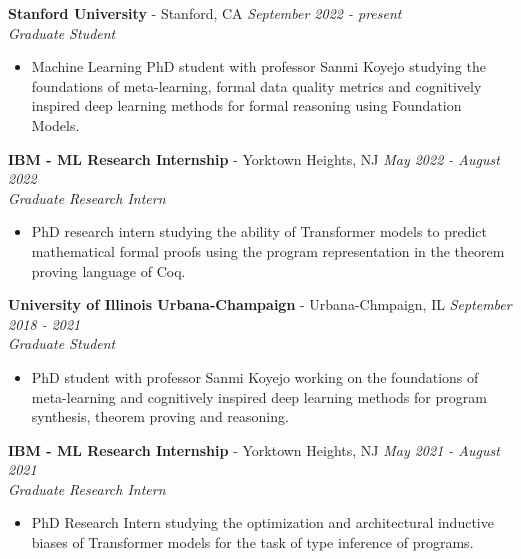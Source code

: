 \documentclass{article}
\newenvironment{changemargin}[2]{%
  \begin{list}{}{%
    \setlength{\topsep}{0pt}%
    \setlength{\leftmargin}{#1}%
    \setlength{\rightmargin}{#2}%
    \setlength{\listparindent}{\parindent}%
    \setlength{\itemindent}{\parindent}%
    \setlength{\parsep}{\parskip}%
  }%
  \item[]}{\end{list}
}
\newenvironment{body} {
	\vspace*{-16pt}
	\begin{changemargin}{-0.25in}{-0.5in}
  }	
	{\end{changemargin}
}
\begin{document}
\begin{body}
	\vspace{16pt}
 
 	\textbf{Stanford University} - Stanford, CA \hfill \emph{September 2022 - present}\\
	\emph{Graduate Student}\\
	\vspace*{-3pt}
	\begin{itemize} \itemsep -2pt  %
		\item Machine Learning PhD student with professor Sanmi Koyejo studying the foundations of meta-learning, formal data quality metrics and cognitively inspired deep learning methods for formal reasoning using Foundation Models.
	\end{itemize}
	\vspace{5 pt}

	\textbf{IBM - ML Research Internship} - Yorktown Heights, NJ \hfill \emph{May 2022 - August 2022}\\
	\emph{Graduate Research Intern}\\
	\vspace*{-3pt}
	\begin{itemize} \itemsep -2pt  %
		\item PhD research intern studying the ability of Transformer models to predict mathematical formal proofs using the program representation in the theorem proving language of Coq.
	\end{itemize}

	\textbf{University of Illinois Urbana-Champaign} - Urbana-Chmpaign, IL \hfill \emph{September 2018 - 2021}\\
	\emph{Graduate Student}\\
	\vspace*{-3pt}
	\begin{itemize} \itemsep -2pt  %
		\item PhD student with professor Sanmi Koyejo working on the foundations of meta-learning and cognitively inspired deep learning methods for program synthesis, theorem proving and reasoning.
	\end{itemize}
	\vspace{5 pt}
	
	\textbf{IBM - ML Research Internship} - Yorktown Heights, NJ \hfill \emph{May 2021 - August 2021}\\
	\emph{Graduate Research Intern}\\
	\vspace*{-3pt}
	\begin{itemize} \itemsep -2pt  %
		\item PhD Research Intern studying the optimization and architectural inductive biases of Transformer models for the task of type inference of programs. 
	\end{itemize}
	\vspace{5 pt}


\end{body}
\end{document}
